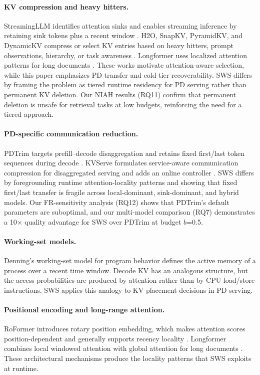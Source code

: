 \documentclass[11pt]{article}
\newcommand{\method}{SWS}
\newcommand{\sws}{SWS}
\theoremstyle{definition}
\theoremstyle{plain}
\begin{document}
\paragraph{KV compression and heavy hitters.}
StreamingLLM identifies attention sinks and enables streaming inference by retaining sink tokens plus a recent window \citep{streamingllm}.  H2O, SnapKV, PyramidKV, and DynamicKV compress or select KV entries based on heavy hitters, prompt observations, hierarchy, or task awareness \citep{h2o,snapkv,pyramidkv,dynamickv}.  Longformer uses localized attention patterns for long documents \citep{longformer}.  These works motivate attention-aware selection, while this paper emphasizes PD transfer and cold-tier recoverability.  \method{} differs by framing the problem as tiered runtime residency for PD serving rather than permanent KV deletion.  Our NIAH results (RQ11) confirm that permanent deletion is unsafe for retrieval tasks at low budgets, reinforcing the need for a tiered approach.

\paragraph{PD-specific communication reduction.}
PDTrim targets prefill--decode disaggregation and retains fixed first/last token sequences during decode \citep{pdtrim}.  KVServe formulates service-aware communication compression for disaggregated serving and adds an online controller \citep{kvserve}.  \method{} differs by foregrounding runtime attention-locality patterns and showing that fixed first/last transfer is fragile across local-dominant, sink-dominant, and hybrid models.  Our FR-sensitivity analysis (RQ12) shows that PDTrim's default parameters are suboptimal, and our multi-model comparison (RQ7) demonstrates a 10$\times$ quality advantage for \sws{} over PDTrim at budget $b$=0.5.

\paragraph{Working-set models.}
Denning's working-set model for program behavior \citep{denning1968working} defines the active memory of a process over a recent time window.  Decode KV has an analogous structure, but the access probabilities are produced by attention rather than by CPU load/store instructions.  \method{} applies this analogy to KV placement decisions in PD serving.

\paragraph{Positional encoding and long-range attention.}
RoFormer introduces rotary position embedding, which makes attention scores position-dependent and generally supports recency locality \citep{su2021roformer}.  Longformer combines local windowed attention with global attention for long documents \citep{longformer}.  These architectural mechanisms produce the locality patterns that \method{} exploits at runtime.
\end{document}

